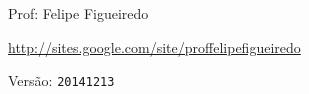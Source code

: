\documentclass[a4paper]{article}
\begin{document}
\parbox[c]{.825\textwidth}{\raggedright%
{Prof: Felipe Figueiredo\par}
{\url{http://sites.google.com/site/proffelipefigueiredo}}
}

Versão: \verb|20141213|



\end{document}
